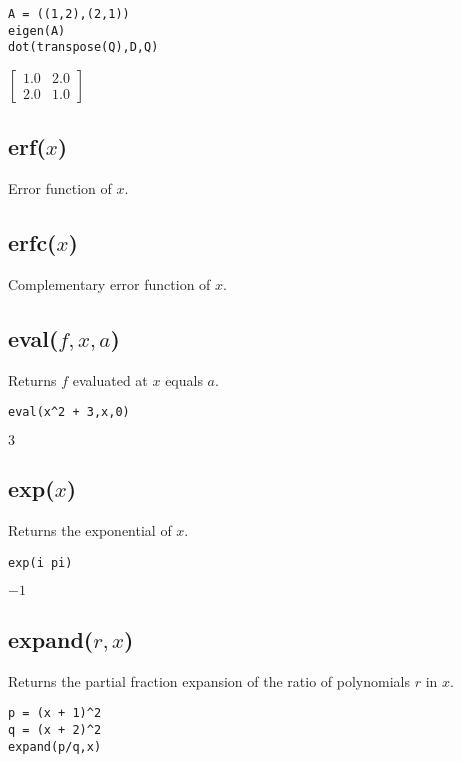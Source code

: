 {\color{blue}
\begin{verbatim}
A = ((1,2),(2,1))
eigen(A)
dot(transpose(Q),D,Q)
\end{verbatim}
}

\noindent
$\displaystyle \begin{bmatrix}
1.0 & 2.0\\
2.0 & 1.0
\end{bmatrix}
$

\subsection*{erf($x$)}

Error function of $x$.

\subsection*{erfc($x$)}

Complementary error function of $x$.

\subsection*{eval($f,x,a$)}

Returns $f$ evaluated at $x$ equals $a$.

{\color{blue}
\begin{verbatim}
eval(x^2 + 3,x,0)
\end{verbatim}
}

\noindent
$3$

\subsection*{exp($x$)}

Returns the exponential of $x$.

{\color{blue}
\begin{verbatim}
exp(i pi)
\end{verbatim}
}

\noindent
$-1$

\subsection*{expand($r,x$)}

Returns the partial fraction expansion of the ratio of polynomials $r$ in $x$.

{\color{blue}
\begin{verbatim}
p = (x + 1)^2
q = (x + 2)^2
expand(p/q,x)
\end{verbatim}
}

